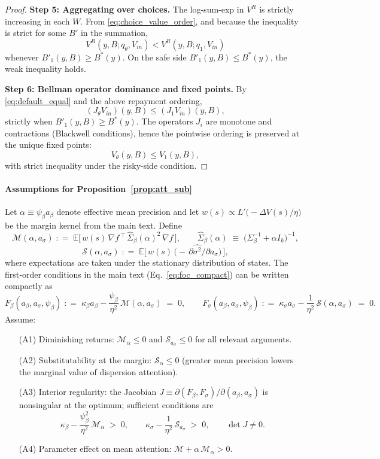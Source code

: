 \documentclass[12pt]{article}
\providecommand{\coloneqq}{\mathrel{\mathop:}=}
\theoremstyle{plain}
\newcommand{\E}{\mathbb{E}}
\begin{document}
\begin{proof}
	\medskip
	\textbf{Step 5: Aggregating over choices.}
	The log-sum-exp in $V^R$ is strictly increasing in each $W$.
	From \eqref{eq:choice_value_order}, and because the inequality is strict for some $B'$ in the summation,
	\[
		V^R(y,B;q_\theta,V_{in}) < V^R(y,B;q_1,V_{in})
	\]
	whenever $B'_1(y,B)\ge B^*(y)$. On the safe side $B'_1(y,B)\le B^*(y)$, the
	weak inequality holds.

	\medskip
	\textbf{Step 6: Bellman operator dominance and fixed points.}
	By \eqref{eq:default_equal} and the above repayment ordering,
	\[
		(J_\theta V_{in})(y,B) \le (J_1V_{in})(y,B),
	\]
	strictly when $B'_1(y,B)\ge B^*(y)$. The operators $J_i$ are monotone and
	contractions (Blackwell conditions), hence the pointwise ordering is preserved
	at the unique fixed points:
	\[
		V_\theta(y,B) \le V_1(y,B),
	\]
	with strict inequality under the risky-side condition.

\end{proof}

\paragraph{Assumptions for Proposition~\ref{prop:att_sub}}\label{app:att_sub_assumptions}
Let $\alpha\equiv \psi_\beta a_\beta$ denote effective mean precision and let $w(s)\propto L'\!\big(-\Delta V(s)/\eta\big)$ be the margin kernel from the main text. Define
\[
	\mathcal M(\alpha,a_\sigma)\;\coloneqq\; \E\big[\,w(s)\,\nabla f\,^{\!\top}\,\hat\Sigma_\beta(\alpha)^{2}\,\nabla f\,\big],\qquad \hat\Sigma_\beta(\alpha)\;\equiv\;\big(\Sigma_\beta^{-1}+\alpha I_k\big)^{-1},
\]
\[
	\mathcal S(\alpha,a_\sigma)\;\coloneqq\; \E\Big[\,w(s)\,\big(-\,\partial\widehat{\sigma^2}/\partial a_\sigma\big)\,\Big],
\]
where expectations are taken under the stationary distribution of states. The
first‑order conditions in the main text (Eq.~\eqref{eq:foc_compact}) can be
written compactly as
\[
	F_\beta(a_\beta,a_\sigma,\psi_\beta)\;\coloneqq\; \kappa_\beta a_\beta-\frac{\psi_\beta}{\eta^2}\,\mathcal M(\alpha,a_\sigma)\;=\;0,\qquad
	F_\sigma(a_\beta,a_\sigma,\psi_\beta)\;\coloneqq\; \kappa_\sigma a_\sigma-\frac{1}{\eta^2}\,\mathcal S(\alpha,a_\sigma)\;=\;0.
\]
Assume:
\begin{enumerate}
	\item[(A1)] Diminishing returns: $\mathcal M_\alpha\le 0$ and $\mathcal S_{a_\sigma}\le 0$ for all relevant arguments.
	\item[(A2)] Substitutability at the margin: $\mathcal S_\alpha\le 0$ (greater mean precision lowers the marginal value of dispersion attention).
	\item[(A3)] Interior regularity: the Jacobian $J\equiv \partial(F_\beta,F_\sigma)/\partial(a_\beta,a_\sigma)$ is nonsingular at the optimum; sufficient conditions are
	      \[
		      \kappa_\beta-\frac{\psi_\beta^{2}}{\eta^2}\,\mathcal M_\alpha\;>\;0,\qquad \kappa_\sigma-\frac{1}{\eta^2}\,\mathcal S_{a_\sigma}\;>\;0,\qquad \det J\neq 0.
	      \]
	\item[(A4)] Parameter effect on mean attention: $\mathcal M+\alpha\,\mathcal M_\alpha>0$.
\end{enumerate}
\end{document}
